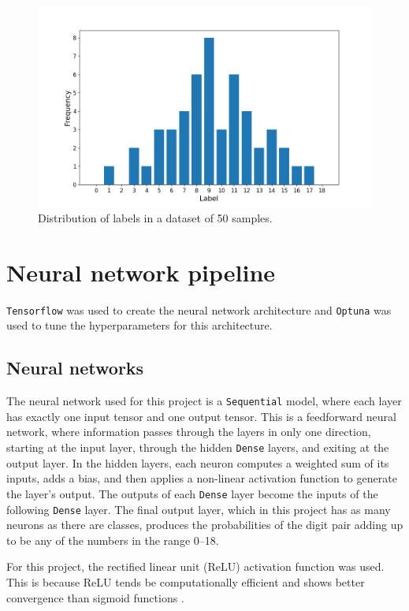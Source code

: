 \documentclass[11pt,a4paper]{article}
\begin{document}
\begin{figure}
    \centering
    \includegraphics[width=\columnwidth, keepaspectratio]{../Y_dist_few.png}
    \caption{Distribution of labels in a dataset of 50 samples.}\label{fig:fewsamples}
\end{figure}

\section{Neural network pipeline}
\texttt{Tensorflow} was used to create the neural network architecture and \texttt{Optuna} was used to tune the hyperparameters for this architecture.

\subsection{Neural networks}
The neural network used for this project is a \texttt{Sequential} model, where each layer has exactly one input tensor and one output tensor. This is a feedforward neural network, where information passes through the layers in only one direction, starting at the input layer, through the hidden \texttt{Dense} layers, and exiting at the output layer. In the hidden layers, each neuron computes a weighted sum of its inputs, adds a bias, and then applies a non-linear activation function to generate the layer's output. The outputs of each \texttt{Dense} layer become the inputs of the following \texttt{Dense} layer. The final output layer, which in this project has as many neurons as there are classes, produces the probabilities of the digit pair adding up to be any of the numbers in the range 0--18.

For this project, the rectified linear unit (ReLU) activation function was used. This is because ReLU tends be computationally efficient and shows better convergence than sigmoid functions \citep{Zeiler2013relu}.
\end{document}
